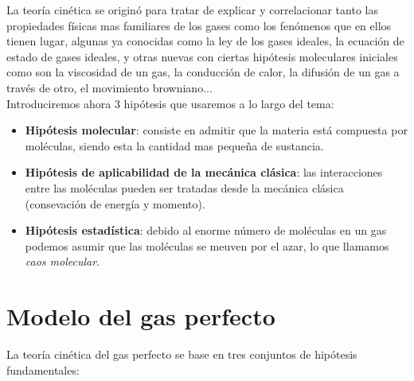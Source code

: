 \documentclass[12pt,a4paper,oneside]{book}
\begin{document}
 La teoría cinética se originó para tratar de explicar y correlacionar tanto las propiedades físicas mas familiares de los gases como los fenómenos que en ellos tienen lugar, algunas ya conocidas como la ley de los gases ideales, la ecuación de estado de gases ideales, y otras nuevas con ciertas hipótesis moleculares iniciales como son la viscosidad de un gas, la conducción de calor, la difusión de un gas a través de otro, el movimiento browniano...   \\
 
Introduciremos ahora 3 hipótesis que usaremos a lo largo del tema:

\begin{itemize}
\item \textbf{Hipótesis molecular}: consiste en admitir que la materia está compuesta por moléculas, siendo esta la cantidad mas pequeña de sustancia.

\item \textbf{Hipótesis de aplicabilidad de la mecánica clásica}: las interacciones entre las moléculas pueden ser tratadas desde la mecánica clásica (consevación de energía y momento).

\item \textbf{Hipótesis estadística}: debido al enorme número de moléculas en un gas podemos asumir que las moléculas se meuven por el azar, lo que llamamos \textit{caos molecular}.
\end{itemize}

\section{Modelo del gas perfecto}

La teoría cinética del gas perfecto se base en tres conjuntos de hipótesis fundamentales:
\end{document}
